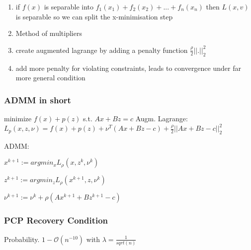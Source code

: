 \documentclass[11pt,twocolumn]{article}
\begin{document}
\begin{enumerate}

\item if $f(x)$ is separable into $f_1(x_1) + f_2(x_2) + ... + f_n(x_n)$
	  then $L(x,v)$ is separable
	  so we can split the x-minimisation step
\item Method of multipliers
\item create augmented lagrange by adding a penalty function $\frac{\rho}{2}|| .||^2_2$
\item add more penalty for violating constraints, leads to convergence under far more general condition
	
\end{enumerate}


\subsubsection{ADMM in short}

minimize $f(x) + p(z)$ s.t. $Ax+Bz=c$
Augm. Lagrange: $L_p(x,z, \nu)= f(x) +p(z)+\nu^T (Ax+Bz-c) + \frac{\rho}{2}  ||Ax+Bz-c||_2^2$

ADMM:

$x^{k+1} := argmin_x L_{\rho} (x, z^k, \nu^k)$

$z^{k+1} := argmin_z L_{\rho} (x^{k+1}, z, \nu^k)$

$\nu^{k+1} := \nu^k + \rho  (Ax^{k+1} + Bz^{k+1} -c)$

\subsubsection{PCP Recovery Condition}

Probability. $ 1 - \mathcal{O}(n^{-10})$ with $\lambda = \frac{1}{sqrt(n)}$
\end{document}
